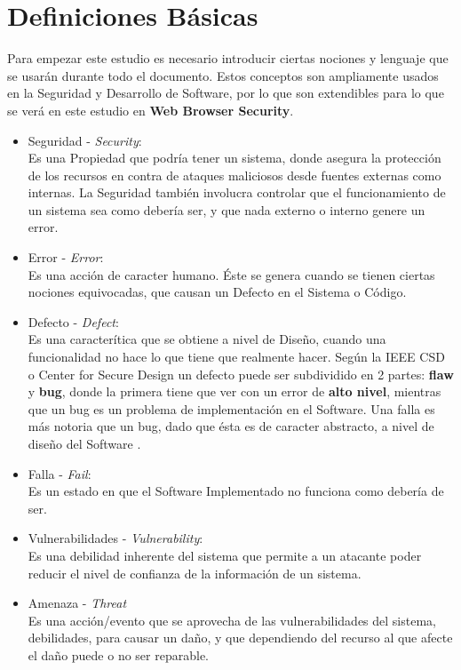 \section{Definiciones Básicas}
\label{chap:Def}

Para empezar este estudio es necesario introducir ciertas nociones y lenguaje que se usarán durante todo el documento. Estos conceptos son ampliamente usados en la Seguridad y Desarrollo de Software, por lo que son extendibles para lo que se verá en este estudio en \textbf{Web Browser Security}.

\begin{itemize}
	\item Seguridad - \textit{Security}:
		\\Es una Propiedad que podría tener un sistema, donde asegura la protección de los recursos en contra de ataques maliciosos desde fuentes externas como internas. La Seguridad también involucra controlar que el funcionamiento de un sistema sea como debería ser, y que nada externo o interno genere un error.
	\item Error - \textit{Error}:
		\\Es una acción de caracter humano. Éste se genera cuando se tienen ciertas nociones equivocadas, que causan un Defecto en el Sistema o Código.
	\item Defecto  - \textit{Defect}:
		\\Es una caracterítica que se obtiene a nivel de Diseño, cuando una funcionalidad no hace lo que tiene que realmente hacer. Según la IEEE CSD o Center for Secure Design un defecto puede ser subdividido en 2 partes: \textbf{flaw} y \textbf{bug}, donde la primera tiene que ver con un error de \textbf{alto nivel}, mientras que un bug es un problema de implementación en el Software. Una falla es más notoria que un bug, dado que ésta es de caracter abstracto, a nivel de diseño del Software \cite{ieeecsd}.
	\item Falla - \textit{Fail}:
		\\Es un estado en que el Software Implementado no funciona como debería de ser.
	\item Vulnerabilidades - \textit{Vulnerability}:
		\\Es una debilidad inherente del sistema que permite a un atacante poder reducir el nivel de confianza de la información de un sistema.
	\item Amenaza - \textit{Threat}
		\\Es una acción/evento que se aprovecha de las vulnerabilidades del sistema, debilidades, para causar un daño, y que dependiendo del recurso al que afecte el daño puede o no ser reparable.

\end{itemize}
